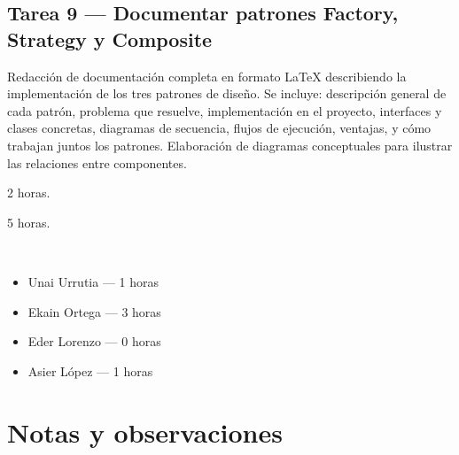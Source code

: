 \documentclass[12pt, a4paper]{article}
\begin{document}
\vspace{0.8em}

\subsection*{Tarea 9 — Documentar patrones Factory, Strategy y Composite}
\begin{description}[leftmargin=2em, style=nextline]
    \item[\textbf{Descripción:}] Redacción de documentación completa en formato LaTeX describiendo la implementación de los tres patrones de diseño. Se incluye: descripción general de cada patrón, problema que resuelve, implementación en el proyecto, interfaces y clases concretas, diagramas de secuencia, flujos de ejecución, ventajas, y cómo trabajan juntos los patrones. Elaboración de diagramas conceptuales para ilustrar las relaciones entre componentes.
    \item[\textbf{Tiempo estimado:}] 2 horas.
    \item[\textbf{Tiempo real:}] 5 horas.
    \item[\textbf{Responsables y dedicación:}]~
        \begin{itemize}[leftmargin=1em, nosep]
            \item Unai Urrutia — 1 horas
            \item Ekain Ortega — 3 horas
            \item Eder Lorenzo — 0 horas
            \item Asier López — 1 horas
        \end{itemize}
\end{description}

\vspace{0.8em}

\section{Notas y observaciones}
\end{document}

